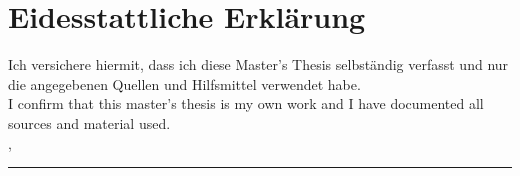 ﻿\chapter{Eidesstattliche Erklärung}
Ich versichere hiermit, dass ich diese Master's Thesis selbständig verfasst und nur die angegebenen Quellen und Hilfsmittel verwendet habe.
\\[1cm]
I confirm that this master's thesis is my own work and I have documented all sources and material used.
\\[6ex]

\city, \submissionDate

\vspace{1.5cm}
\rule[-0.2cm]{5cm}{0.5pt}

\textsc{\authorname} 